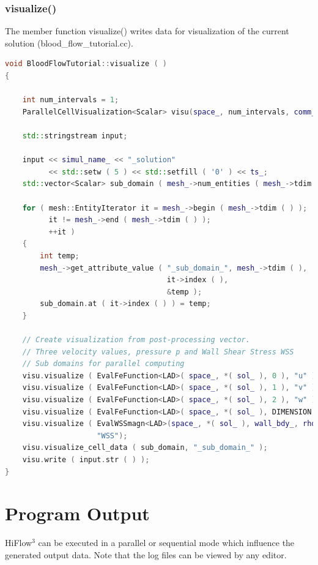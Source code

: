 \documentclass[a4paper, 11pt, twoside]{article}
\begin{document}
\subsubsection{visualize()}\label{sec:visualize}
The member function visualize() writes data for visualization of the current solution (blood\_flow\_tutorial.cc).

\begin{lstlisting}[language=C++, basicstyle={\footnotesize, \ttfamily}, keywordstyle=\color{blue},  numbers=none, tabsize=4]
void BloodFlowTutorial::visualize ( )
{

    int num_intervals = 1;
    ParallelCellVisualization<Scalar> visu(space_, num_intervals, comm_, MASTER_RANK);

    std::stringstream input;

    input << simul_name_ << "_solution" 
          << std::setw ( 5 ) << std::setfill ( '0' ) << ts_;
    std::vector<Scalar> sub_domain ( mesh_->num_entities ( mesh_->tdim ( ) ), 0 );

    for ( mesh::EntityIterator it = mesh_->begin ( mesh_->tdim ( ) );
          it != mesh_->end ( mesh_->tdim ( ) );
          ++it )
    {
        int temp;
        mesh_->get_attribute_value ( "_sub_domain_", mesh_->tdim ( ),
                                     it->index ( ),
                                     &temp );
        sub_domain.at ( it->index ( ) ) = temp;
    }

    // Create visualization from post-processing vector.
    // Three velocity values, pressure p and Wall Shear Stress WSS
    // Sub domains for parallel computing
    visu.visualize ( EvalFeFunction<LAD>( space_, *( sol_ ), 0 ), "u" );
    visu.visualize ( EvalFeFunction<LAD>( space_, *( sol_ ), 1 ), "v" );
    visu.visualize ( EvalFeFunction<LAD>( space_, *( sol_ ), 2 ), "w" );
    visu.visualize ( EvalFeFunction<LAD>( space_, *( sol_ ), DIMENSION ), "p" );
    visu.visualize ( EvalWSSmagn<LAD>(space_, *( sol_ ), wall_bdy_, rho_ * nu_ ),
    			     "WSS");
    visu.visualize_cell_data ( sub_domain, "_sub_domain_" );
    visu.write ( input.str ( ) );
}
\end{lstlisting}

\section{Program Output}
HiFlow$^3$ can be executed in a parallel or sequential mode which influence the generated output data. Note that the log files can be viewed by any editor.
\end{document}
